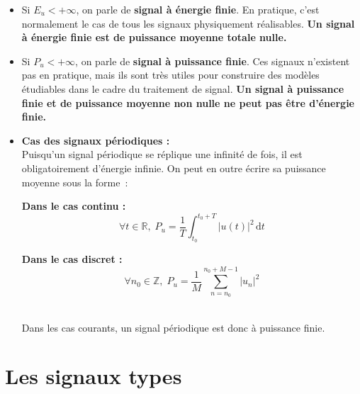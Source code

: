 \begin{itemize} 
		
	\item Si $E_u < +\infty$, on parle de \textbf{signal à énergie finie}. En pratique, c'est normalement le cas de tous les signaux physiquement réalisables. \textbf{Un signal à énergie finie est de puissance moyenne totale nulle.} \\

	\item Si $P_u < + \infty$, on parle de \textbf{signal à puissance finie}. Ces signaux n'existent pas en pratique, mais ils sont très utiles pour construire des modèles étudiables dans le cadre du traitement de signal. \textbf{Un signal à puissance finie et de puissance moyenne non nulle ne peut pas être d'énergie finie.} \\

	\item \textbf{Cas des signaux périodiques :} \\

	Puisqu'un signal périodique se réplique une infinité de fois, il est obligatoirement d'énergie infinie. On peut en outre écrire sa puissance moyenne sous la forme~: \\

\begin{minipage}[t]{0.45\textwidth}
\textbf{Dans le cas continu :} \\
\begin{equation}
	\forall t \in \mathbb{R}, \; P_u = \dfrac{1}{T} \int_{t_0}^{t_0+T} | u(t) |^2\,\mathrm{d}t
\end{equation}
\end{minipage}
\hfill\vline\hfill
\begin{minipage}[t]{0.45\textwidth}
\textbf{Dans le cas discret :} \\
\begin{equation}
	\forall n_0 \in \mathbb{Z}, \; P_u = \dfrac{1}{M}\sum_{n=n_0}^{n_0+M-1} |u_n|^2 
\end{equation}
\end{minipage} \\

Dans les cas courants, un signal périodique est donc à puissance finie. 
\end{itemize}

\section{Les signaux types}


